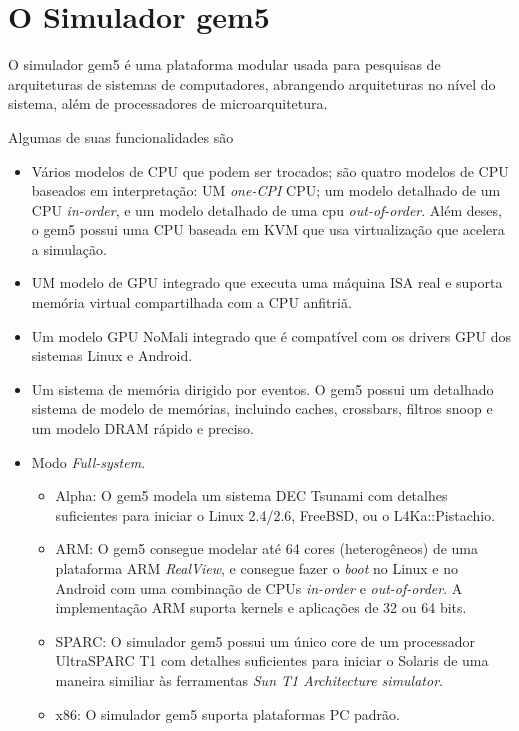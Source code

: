 \documentclass[12pt]{article}
\begin{document}
\section{O Simulador gem5} \label{sec:gem5}
O simulador gem5 é uma plataforma modular usada para pesquisas de arquiteturas de sistemas de computadores, abrangendo arquiteturas no nível do sistema, além de processadores de microarquitetura.

Algumas de suas funcionalidades são 
\begin{itemize}
    \item Vários modelos de CPU que podem ser trocados; são quatro modelos de CPU baseados em interpretação:
    UM \textit{one-CPI} CPU; um modelo detalhado de um CPU \textit{in-order}, e um modelo detalhado de uma cpu \textit{out-of-order}. Além deses, o gem5 possui uma CPU baseada em KVM que usa virtualização que acelera a simulação.
    \item UM modelo de GPU integrado que executa uma máquina ISA real e suporta memória virtual compartilhada com a CPU anfitriã. 
    \item Um modelo GPU NoMali integrado que é compatível com os drivers GPU dos sistemas Linux e Android. 
    \item Um sistema de memória dirigido por eventos. O gem5 possui um detalhado sistema de modelo de memórias, incluindo caches, crossbars, filtros snoop e um modelo DRAM rápido e preciso.
    \item Modo \textit{Full-system}.
    \begin{itemize}
        \item Alpha: O gem5 modela um sistema DEC Tsunami com detalhes suficientes para iniciar o Linux 2.4/2.6, FreeBSD, ou o L4Ka::Pistachio.
        \item ARM: O gem5 consegue modelar até 64 cores (heterogêneos) de uma plataforma ARM \textit{RealView}, e consegue fazer o \textit{boot} no Linux e no Android com uma combinação de CPUs \textit{in-order} e \textit{out-of-order}. A implementação ARM suporta kernels e aplicações de 32 ou 64 bits.
        \item SPARC: O simulador gem5 possui um único core de um processador UltraSPARC T1 com detalhes suficientes para iniciar o Solaris de uma maneira similiar às ferramentas \textit{Sun T1 Architecture simulator}.
        \item x86: O simulador gem5 suporta plataformas PC padrão.
    \end{itemize}

\end{itemize}
\end{document}
